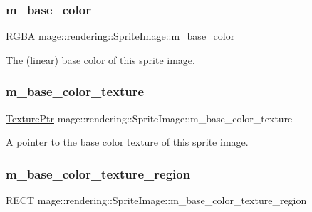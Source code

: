 \subsubsection{\texorpdfstring{m\+\_\+base\+\_\+color}{m\_base\_color}}
{\footnotesize\ttfamily \hyperlink{structmage_1_1_r_g_b_a}{R\+G\+BA} mage\+::rendering\+::\+Sprite\+Image\+::m\+\_\+base\+\_\+color\hspace{0.3cm}{\ttfamily [private]}}

The (linear) base color of this sprite image. \hypertarget{classmage_1_1rendering_1_1_sprite_image_a1b68c232550bfc55aa794fcffbeab489}{}\label{classmage_1_1rendering_1_1_sprite_image_a1b68c232550bfc55aa794fcffbeab489} 
\subsubsection{\texorpdfstring{m\+\_\+base\+\_\+color\+\_\+texture}{m\_base\_color\_texture}}
{\footnotesize\ttfamily \hyperlink{namespacemage_1_1rendering_a6f3ae54f825328465b0cdde0f0de4a36}{Texture\+Ptr} mage\+::rendering\+::\+Sprite\+Image\+::m\+\_\+base\+\_\+color\+\_\+texture\hspace{0.3cm}{\ttfamily [private]}}

A pointer to the base color texture of this sprite image. \hypertarget{classmage_1_1rendering_1_1_sprite_image_a18de0a4473e2bfee074cd152d1ba2c3e}{}\label{classmage_1_1rendering_1_1_sprite_image_a18de0a4473e2bfee074cd152d1ba2c3e} 
\subsubsection{\texorpdfstring{m\+\_\+base\+\_\+color\+\_\+texture\+\_\+region}{m\_base\_color\_texture\_region}}
{\footnotesize\ttfamily R\+E\+CT mage\+::rendering\+::\+Sprite\+Image\+::m\+\_\+base\+\_\+color\+\_\+texture\+\_\+region\hspace{0.3cm}{\ttfamily [private]}}

